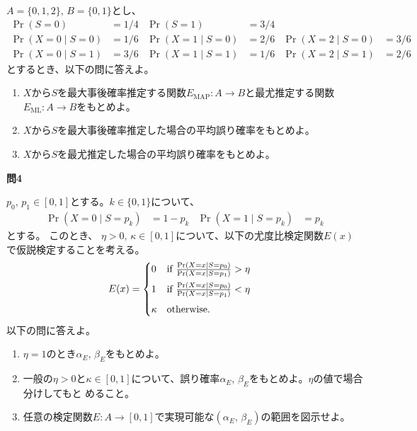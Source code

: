 \documentclass[lualatex,ja=standard,a4paper]{bxjsarticle}
\theoremstyle{definition}
\theoremstyle{remark}
\begin{document}
\vspace{1em}
$A=\{0,1,2\},\,B=\{0, 1\}$とし、
\begin{align*}
\Pr(S = 0) &= 1/4&
\Pr(S = 1) &= 3/4\\
\Pr(X=0\mid S=0) &= 1/6&
\Pr(X=1\mid S=0) &= 2/6&
\Pr(X=2\mid S=0) &= 3/6\\
\Pr(X=0\mid S=1) &= 3/6&
\Pr(X=1\mid S=1) &= 1/6&
\Pr(X=2\mid S=1) &= 2/6
\end{align*}
とするとき、以下の問に答えよ。
\vspace{1em}
\begin{enumerate}[label=(\arabic*)]
\setlength{\itemsep}{1em}
\item $X$から$S$を最大事後確率推定する関数$E_{\mathrm{MAP}}\colon A\to B$と最尤推定する関数$E_{\mathrm{ML}}\colon A\to B$をもとめよ。
\item $X$から$S$を最大事後確率推定した場合の平均誤り確率をもとめよ。
\item $X$から$S$を最尤推定した場合の平均誤り確率をもとめよ。
\end{enumerate}


\vspace{1em}
{\noindent\large\bfseries 問4}

\vspace{1em}
$p_0,\,p_1\in[0,1]$とする。$k\in\{0,1\}$について、
\begin{align*}
\Pr(X = 0 \mid S = p_k) &= 1-p_k&
\Pr(X = 1 \mid S = p_k) &= p_k
\end{align*}
とする。
このとき、 $\eta> 0,\,\kappa\in[0,1]$について、以下の尤度比検定関数$E(x)$で仮説検定することを考える。
\begin{align*}
E(x)&=
\begin{cases}
\vspace{.5em}
0&\text{if } \frac{\Pr(X = x\mid S = p_0)}{\Pr(X = x\mid S = p_1)} > \eta\\\vspace{.5em}
1&\text{if } \frac{\Pr(X = x\mid S = p_0)}{\Pr(X = x\mid S = p_1)} < \eta\\
\kappa&\text{otherwise.}
\end{cases}
\end{align*}
以下の問に答えよ。
\begin{enumerate}
\setlength{\itemsep}{1em}
\item $\eta=1$のとき$\alpha_E$, $\beta_E$をもとめよ。
\item 一般の$\eta>0$と$\kappa\in[0,1]$について、誤り確率$\alpha_E$, $\beta_E$をもとめよ。$\eta$の値で場合分けしてもと
めること。
\item 任意の検定関数$E\colon A\to[0,1]$で実現可能な$(\alpha_E,\, \beta_E)$の範囲を図示せよ。
\end{enumerate}
\end{document}
